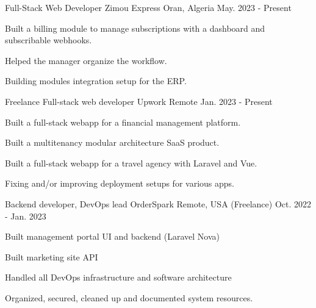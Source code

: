 

\begin{cventries}
  \cventry
    {Full-Stack Web Developer} %
    {Zimou Express} %
    {Oran, Algeria} %
    {May. 2023 - Present} %
    {
      \begin{cvitems} %
        \item {Built a billing module to manage subscriptions with a dashboard and subscribable webhooks.}
        \item {Helped the manager organize the workflow.}
        \item {Building modules integration setup for the ERP.}
      \end{cvitems}
    }

  \cventry
    {Freelance Full-stack web developer} %
    {Upwork} %
    {Remote} %
    {Jan. 2023 - Present} %
    {
      \begin{cvitems} %
        \item {Built a full-stack webapp for a financial management platform.}
        \item {Built a multitenancy modular architecture SaaS product.}
        \item {Built a full-stack webapp for a travel agency with Laravel and Vue.}
        \item {Fixing and/or improving deployment setups for various apps.}
      \end{cvitems}
    }

  \cventry
    {Backend developer, DevOps lead} %
    {OrderSpark} %
    {Remote, USA (Freelance)} %
    {Oct. 2022 - Jan. 2023} %
    {
      \begin{cvitems} %
        \item {Built management portal UI and backend (Laravel Nova)}
        \item {Built marketing site API}
        \item {Handled all DevOps infrastructure and software architecture}
        \item {Organized, secured, cleaned up and documented system resources.}
      \end{cvitems}
    }


\end{cventries}
